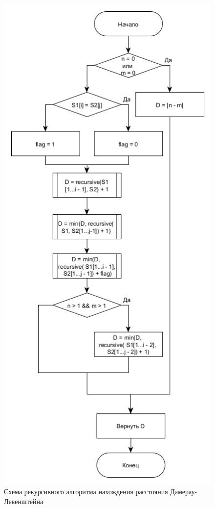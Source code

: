 \begin{figure}[h]
	\centering
	\includegraphics[scale = 0.7]{img/damerrec.png}
	\caption{Схема рекурсивного алгоритма нахождения расстояния Дамерау-Левенштейна}
	\label{fig:damerrec}
\end{figure}
